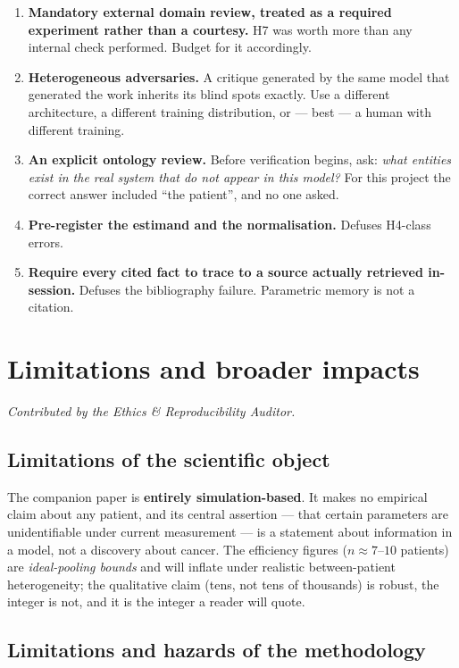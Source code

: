\documentclass[11pt,a4paper]{article}
\begin{document}
\begin{enumerate}[leftmargin=1.8em,itemsep=0.3em]
\item \textbf{Mandatory external domain review, treated as a required experiment rather
than a courtesy.} H7 was worth more than any internal check performed. Budget for it
accordingly.
\item \textbf{Heterogeneous adversaries.} A critique generated by the same model that
generated the work inherits its blind spots exactly. Use a different architecture, a
different training distribution, or --- best --- a human with different training.
\item \textbf{An explicit ontology review.} Before verification begins, ask: \emph{what
entities exist in the real system that do not appear in this model?} For this project
the correct answer included ``the patient'', and no one asked.
\item \textbf{Pre-register the estimand and the normalisation.} Defuses H4-class errors.
\item \textbf{Require every cited fact to trace to a source actually retrieved in-session.}
Defuses the bibliography failure. Parametric memory is not a citation.
\end{enumerate}

\section{Limitations and broader impacts}
\emph{Contributed by the Ethics \& Reproducibility Auditor.}

\subsection{Limitations of the scientific object}

The companion paper is \textbf{entirely simulation-based}. It makes no empirical claim
about any patient, and its central assertion --- that certain parameters are
unidentifiable under current measurement --- is a statement about information in a model,
not a discovery about cancer. The efficiency figures ($n \approx 7$--$10$ patients) are
\emph{ideal-pooling bounds} and will inflate under realistic between-patient
heterogeneity; the qualitative claim (tens, not tens of thousands) is robust, the integer
is not, and it is the integer a reader will quote.

\subsection{Limitations and hazards of the methodology}
\end{document}
